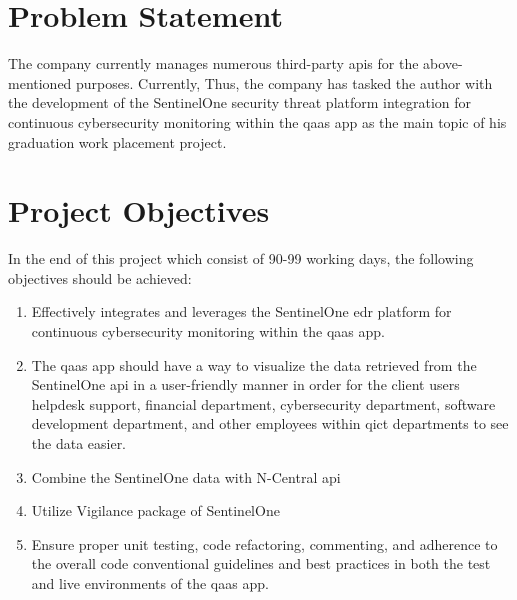 \begin{multicols}{2}
      \section{Problem Statement}
      The company currently manages numerous third-party \acrshort{api}s for the above-mentioned purposes.
      Currently,
      Thus, the company has tasked the author with the development of the SentinelOne security threat platform integration
      for continuous cybersecurity monitoring within the \acrshort{qaas} app as the main topic of his graduation work placement
      project.

      \section{Project Objectives}
      In the end of this project which consist of 90-99 working days, the following objectives should be achieved:
      \begin{enumerate}
            \item Effectively integrates and leverages the SentinelOne \acrshort{edr} platform for continuous
                  cybersecurity monitoring within the \acrshort{qaas} app.
            \item The \acrshort{qaas} app should have a way to visualize the data retrieved from the SentinelOne
                  \acrshort{api} in a user-friendly manner in order for the client users helpdesk support, financial
                  department, cybersecurity department, software development department, and other employees within
                  \acrshort{qict}  departments to see the data easier.
            \item Combine the SentinelOne data with N-Central \acrshort{api}
            \item Utilize Vigilance package of SentinelOne
            \item Ensure proper unit testing, code refactoring, commenting, and adherence to the overall code
                  conventional guidelines and best practices in both the test and live environments of the
                  \acrshort{qaas} app.
      \end{enumerate}

\end{multicols}
